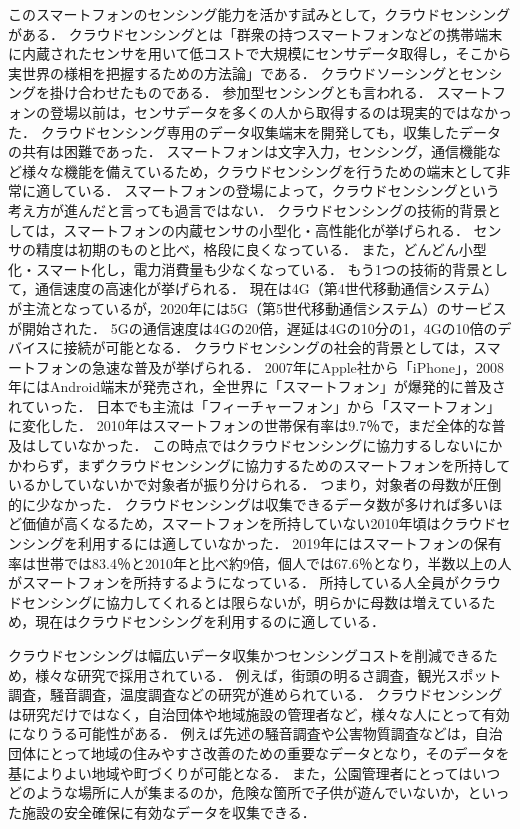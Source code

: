 このスマートフォンのセンシング能力を活かす試みとして，クラウドセンシングがある．
クラウドセンシングとは「群衆の持つスマートフォンなどの携帯端末に内蔵されたセンサを用いて低コストで大規模にセンサデータ取得し，そこから実世界の様相を把握するための方法論\cite{weko}」である．
クラウドソーシングとセンシングを掛け合わせたものである．
参加型センシングとも言われる．
スマートフォンの登場以前は，センサデータを多くの人から取得するのは現実的ではなかった．
クラウドセンシング専用のデータ収集端末を開発しても，収集したデータの共有は困難であった．
スマートフォンは文字入力，センシング，通信機能など様々な機能を備えているため，クラウドセンシングを行うための端末として非常に適している．
スマートフォンの登場によって，クラウドセンシングという考え方が進んだと言っても過言ではない．
クラウドセンシングの技術的背景としては，スマートフォンの内蔵センサの小型化・高性能化が挙げられる．
センサの精度は初期のものと比べ，格段に良くなっている．
また，どんどん小型化・スマート化し，電力消費量も少なくなっている．
もう1つの技術的背景として，通信速度の高速化が挙げられる．
現在は4G（第4世代移動通信システム）が主流となっているが，2020年には5G（第5世代移動通信システム）のサービスが開始された．
5Gの通信速度は4Gの20倍，遅延は4Gの10分の1，4Gの10倍のデバイスに接続が可能となる\cite{5G4G}．
クラウドセンシングの社会的背景としては，スマートフォンの急速な普及が挙げられる．
2007年にApple社から「iPhone」，2008年にはAndroid端末が発売され，全世界に「スマートフォン」が爆発的に普及されていった．
日本でも主流は「フィーチャーフォン」から「スマートフォン」に変化した．
2010年はスマートフォンの世帯保有率は9.7％\cite{soumu}で，まだ全体的な普及はしていなかった．
この時点ではクラウドセンシングに協力するしないにかかわらず，まずクラウドセンシングに協力するためのスマートフォンを所持しているかしていないかで対象者が振り分けられる．
つまり，対象者の母数が圧倒的に少なかった．
クラウドセンシングは収集できるデータ数が多ければ多いほど価値が高くなるため，スマートフォンを所持していない2010年頃はクラウドセンシングを利用するには適していなかった．
2019年にはスマートフォンの保有率は世帯では83.4％と2010年と比べ約9倍，個人では67.6％\cite{soumu}となり，半数以上の人がスマートフォンを所持するようになっている．
所持している人全員がクラウドセンシングに協力してくれるとは限らないが，明らかに母数は増えているため，現在はクラウドセンシングを利用するのに適している．

クラウドセンシングは幅広いデータ収集かつセンシングコストを削減できるため，様々な研究で採用されている．
例えば，街頭の明るさ調査，観光スポット調査，騒音調査，温度調査などの研究が進められている\cite{liu}．
クラウドセンシングは研究だけではなく，自治団体や地域施設の管理者など，様々な人にとって有効になりうる可能性がある．
例えば先述の騒音調査や公害物質調査などは，自治団体にとって地域の住みやすさ改善のための重要なデータとなり，そのデータを基によりよい地域や町づくりが可能となる．
また，公園管理者にとってはいつどのような場所に人が集まるのか，危険な箇所で子供が遊んでいないか，といった施設の安全確保に有効なデータを収集できる．

